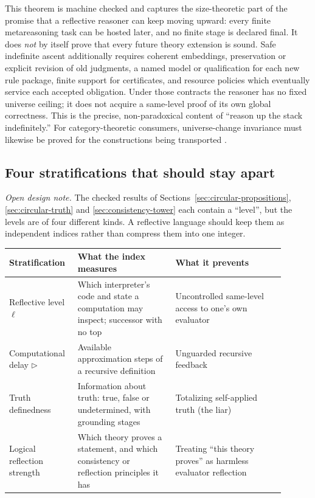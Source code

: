 \documentclass[11pt]{article}
\theoremstyle{definition}
\theoremstyle{remark}
\begin{document}
This theorem is machine checked and captures the size-theoretic part of the
promise that a reflective reasoner can keep moving upward: every finite
metareasoning task can be hosted later, and no finite stage is declared final.
It does \emph{not} by itself prove that every future theory extension is sound.
Safe indefinite ascent additionally requires coherent embeddings, preservation
or explicit revision of old judgments, a named model or qualification for each
new rule package, finite support for certificates, and resource policies which
eventually service each accepted obligation.  Under those contracts the reasoner
has no fixed universe ceiling; it does not acquire a same-level proof of its own
global correctness.  This is the precise, non-paradoxical content of ``reason up
the stack indefinitely.''  For category-theoretic consumers, universe-change
invariance must likewise be proved for the constructions being transported
\cite{ShulmanSetTheory,LowUniverses}.

\subsection{Four stratifications that should stay apart}
\label{sec:four-stratifications}

\emph{Open design note.}  The checked results of
Sections~\ref{sec:circular-propositions}, \ref{sec:circular-truth} and
\ref{sec:consistency-tower} each contain a ``level'', but the levels are of four
different kinds.  A reflective language should keep them as independent indices
rather than compress them into one integer.

\begin{longtable}{>{\raggedright\arraybackslash}p{0.20\linewidth}%
                  >{\raggedright\arraybackslash}p{0.33\linewidth}%
                  >{\raggedright\arraybackslash}p{0.37\linewidth}}
\toprule
Stratification & What the index measures & What it prevents \\
\midrule
\endhead
Reflective level $\ell$ & Which interpreter's code and state a computation
  may inspect; successor with no top & Uncontrolled same-level access to one's
  own evaluator \\
Computational delay $\triangleright$ & Available approximation steps of a
  recursive definition & Unguarded recursive feedback \\
Truth definedness & Information about truth: true, false or undetermined, with
  grounding stages & Totalizing self-applied truth (the liar) \\
Logical reflection strength & Which theory proves a statement, and which
  consistency or reflection principles it has & Treating ``this theory
  proves'' as harmless evaluator reflection \\
\bottomrule
\end{longtable}
\end{document}
